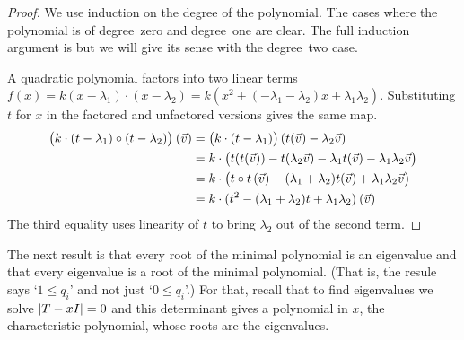 \begin{proof}
We use induction on the degree of the polynomial.
The cases where the polynomial is of
degree~zero and degree~one are clear.
The full induction argument is 
but we will give its sense with the degree~two case.

A quadratic polynomial factors into two
linear terms \( f(x)=k(x-\lambda_1)\cdot(x-\lambda_2)
                    =k(x^2+(-\lambda_1-\lambda_2)x+\lambda_1\lambda_2) \).
Substituting \( t \) 
for \( x \) in the factored and
unfactored versions gives the same map.
\begin{align*}
   \bigl(k\cdot(t-\lambda_1)\mathbin{\circ} (t-\lambda_2)\bigr)\>(\vec{v})
   &=\bigl(k\cdot(t-\lambda_1)\bigr)\,(t(\vec{v})-\lambda_2\vec{v})    \\
   &=k\cdot\bigl(t(t(\vec{v}))-t(\lambda_2\vec{v})
      -\lambda_1 t(\vec{v})-\lambda_1\lambda_2\vec{v}\bigr)    \\
   &=k\cdot \bigl(t\mathbin{\circ} t\,(\vec{v})-(\lambda_1+\lambda_2)t(\vec{v})
          +\lambda_1\lambda_2\vec{v}\bigr)                    \\
   &=k\cdot(t^2-(\lambda_1+\lambda_2)t+\lambda_1\lambda_2)\>(\vec{v})
\end{align*}
The third equality uses linearity of \( t \) to bring $\lambda_2$ out of the
second term.
\end{proof}


The next result is that
every root of the minimal polynomial is an eigenvalue and
that every eigenvalue is a root of the minimal polynomial. 
(That is, the resule says `$1\leq q_i$' and 
not just `$0\leq q_i$'.)
For that, recall that to find eigenvalues
we solve $\deter{T-xI}=0$ and 
this determinant gives a polynomial in $x$, 
the characteristic polynomial, 
whose roots are the eigenvalues.

